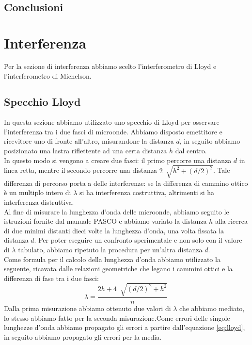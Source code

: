 \documentclass[letterpaper,12pt]{article}
\begin{document}
\subsection{Conclusioni}

\section{Interferenza}
Per la sezione di interferenza abbiamo scelto l'interferometro di Lloyd e l'interferometro di Michelson.\\

\subsection{Specchio Lloyd}
In questa sezione abbiamo utilizzato uno specchio di Lloyd per osservare l'interferenza tra i due fasci di microonde.
Abbiamo disposto emettitore e ricevitore uno di fronte all'altro, misurandone la distanza $d$, in seguito abbiamo
posizionato una lastra riflettente ad una certa distanza $h$ dal centro. \\
In questo modo si vengono a creare due fasci: il primo percorre una distanza $d$ in linea retta, mentre il secondo
percorre una distanza $2\ \sqrt[]{h^2 + (d/2)^2}$. Tale differenza di percorso porta a delle interferenze:
se la differenza di cammino ottico è un multiplo intero di $\lambda$ si ha interferenza costruttiva,
altrimenti si ha interferenza distruttiva.\\
Al fine di misurare la lunghezza d'onda delle microonde, abbiamo seguito le istruzioni fornite dal manuale
PASCO e abbiamo variato la distanza $h$ alla ricerca di due minimi distanti dieci volte la lunghezza d'onda,
una volta fissata la distanza $d$. Per poter eseguire un confronto sperimentale e non solo con il valore di $\lambda$
tabulato, abbiamo ripetuto la procedura per un'altra distanza $d$. \\
Come formula per il calcolo della lunghezza d'onda abbiamo utilizzato la seguente, ricavata dalle relazioni geometriche
che legano i cammini ottici e la differenza di fase tra i due fasci:
\begin{equation}
	\lambda = \frac{2h + 4\ \sqrt[]{(d/2)^2 + h^2}}{n}
	\label{eq:lloyd}
\end{equation}
Dalla prima misurazione abbiamo ottenuto due valori di $\lambda$ che abbiamo mediato, lo stesso abbiamo fatto per
la seconda misurazione.Come errori delle singole lunghezze d'onda abbiamo propagato gli errori a partire dall'equazione
\ref{eq:lloyd}, in seguito abbiamo propagato gli errori per la media. \\
\end{document}
